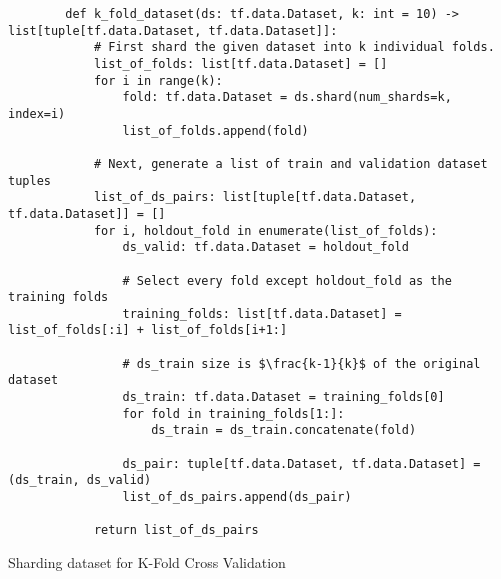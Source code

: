 \begin{listing}[H]
        \begin{verbatim}
        def k_fold_dataset(ds: tf.data.Dataset, k: int = 10) -> list[tuple[tf.data.Dataset, tf.data.Dataset]]:
            # First shard the given dataset into k individual folds.
            list_of_folds: list[tf.data.Dataset] = []
            for i in range(k):
                fold: tf.data.Dataset = ds.shard(num_shards=k, index=i)
                list_of_folds.append(fold)
        
            # Next, generate a list of train and validation dataset tuples
            list_of_ds_pairs: list[tuple[tf.data.Dataset, tf.data.Dataset]] = []
            for i, holdout_fold in enumerate(list_of_folds):
                ds_valid: tf.data.Dataset = holdout_fold
        
                # Select every fold except holdout_fold as the training folds
                training_folds: list[tf.data.Dataset] = list_of_folds[:i] + list_of_folds[i+1:]

                # ds_train size is $\frac{k-1}{k}$ of the original dataset
                ds_train: tf.data.Dataset = training_folds[0]
                for fold in training_folds[1:]:
                    ds_train = ds_train.concatenate(fold)
        
                ds_pair: tuple[tf.data.Dataset, tf.data.Dataset] = (ds_train, ds_valid)
                list_of_ds_pairs.append(ds_pair)
            
            return list_of_ds_pairs
        \end{verbatim}
    \caption{Sharding dataset for K-Fold Cross Validation}\label{listing:sharding}
\end{listing}